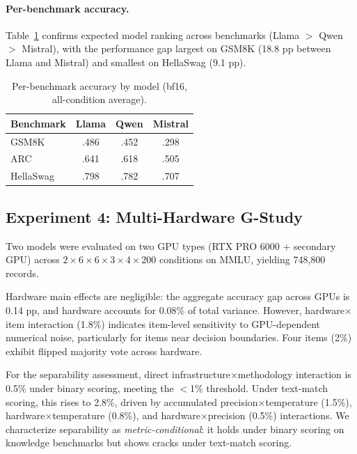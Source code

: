 \documentclass[letterpaper,11pt]{article}
\begin{document}
\paragraph{Per-benchmark accuracy.}
Table~\ref{tab:acc_bench} confirms expected model ranking across benchmarks (Llama $>$ Qwen $>$ Mistral), with the performance gap largest on GSM8K (18.8 pp between Llama and Mistral) and smallest on HellaSwag (9.1 pp).

\begin{table}[t]
\centering
\caption{Per-benchmark accuracy by model (bf16, all-condition average).}
\label{tab:acc_bench}
\small
\begin{tabular}{@{}l ccc@{}}
\toprule
Benchmark & Llama & Qwen & Mistral \\
\midrule
GSM8K     & .486  & .452 & .298 \\
ARC       & .641  & .618 & .505 \\
HellaSwag & .798  & .782 & .707 \\
\bottomrule
\end{tabular}
\end{table}

\subsection{Experiment 4: Multi-Hardware G-Study}
\label{sec:exp3}

Two models were evaluated on two GPU types (RTX PRO 6000 + secondary GPU) across $2 \times 6 \times 6 \times 3 \times 4 \times 200$ conditions on MMLU, yielding 748{,}800 records.

Hardware main effects are negligible: the aggregate accuracy gap across GPUs is 0.14 pp, and hardware accounts for 0.08\% of total variance.
However, hardware$\times$item interaction (1.8\%) indicates item-level sensitivity to GPU-dependent numerical noise, particularly for items near decision boundaries.
Four items (2\%) exhibit flipped majority vote across hardware.

For the separability assessment, direct infrastructure$\times$methodology interaction is 0.5\% under binary scoring, meeting the $<$1\% threshold.
Under text-match scoring, this rises to 2.8\%, driven by accumulated precision$\times$temperature (1.5\%), hardware$\times$temperature (0.8\%), and hardware$\times$precision (0.5\%) interactions.
We characterize separability as \emph{metric-conditional}: it holds under binary scoring on knowledge benchmarks but shows cracks under text-match scoring.
\end{document}

